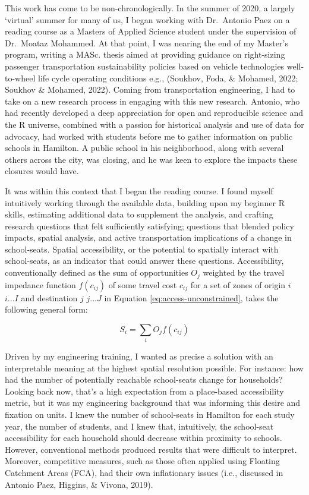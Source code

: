 \documentclass[
11pt, %
oneside, %
english, %
singlespacing, %
]{macthesis} %
\begin{document}
This work has come to be non-chronologically. In the summer of 2020, a largely `virtual' summer for many of us, I began working with Dr.~Antonio Paez on a reading course as a Masters of Applied Science student under the supervision of Dr.~Moataz Mohammed. At that point, I was nearing the end of my Master's program, writing a MASc. thesis aimed at providing guidance on right-sizing passenger transportation sustainability policies based on vehicle technologies well-to-wheel life cycle operating conditions e.g., (Soukhov, Foda, \& Mohamed, 2022; Soukhov \& Mohamed, 2022). Coming from transportation engineering, I had to take on a new research process in engaging with this new research. Antonio, who had recently developed a deep appreciation for open and reproducible science and the R universe, combined with a passion for historical analysis and use of data for advocacy, had worked with students before me to gather information on public schools in Hamilton. A public school in his neighborhood, along with several others across the city, was closing, and he was keen to explore the impacts these closures would have.

It was within this context that I began the reading course. I found myself intuitively working through the available data, building upon my beginner R skills, estimating additional data to supplement the analysis, and crafting research questions that felt sufficiently satisfying; questions that blended policy impacts, spatial analysis, and active transportation implications of a change in school-seats. Spatial accessibility, or the potential to spatially interact with school-seats, as an indicator that could answer these questions. Accessibility, conventionally defined as the sum of opportunities \(O_j\) weighted by the travel impedance function \(f(c_{ij})\) of some travel cost \(c_{ij}\) for a set of zones of origin \(i\) \(i...I\) and destination \(j\) \(j...J\) in Equation \ref{eq:access-unconstrained}, takes the following general form:

\begin{equation}
\label{eq:access-unconstrained}
S_i = \sum_i O_j f(c_{ij}) 
\end{equation} 

Driven by my engineering training, I wanted as precise a solution with an interpretable meaning at the highest spatial resolution possible. For instance: how had the number of potentially reachable school-seats change for households? Looking back now, that's a high expectation from a place-based accessibility metric, but it was my engineering background that was informing this desire and fixation on units. I knew the number of school-seats in Hamilton for each study year, the number of students, and I knew that, intuitively, the school-seat accessibility for each household should decrease within proximity to schools. However, conventional methods produced results that were difficult to interpret. Moreover, competitive measures, such as those often applied using Floating Catchment Areas (FCA), had their own inflationary issues (i.e., discussed in Antonio Paez, Higgins, \& Vivona, 2019).
\end{document}
